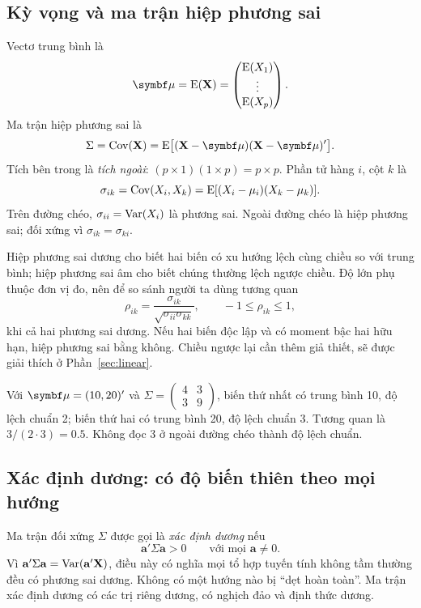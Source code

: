\subsection{Kỳ vọng và ma trận hiệp phương sai}
Vectơ trung bình là
\[
 \vmu=\E(\mathbf X)=\begin{pmatrix}\E(X_1)\\\vdots\\\E(X_p)\end{pmatrix}.
\]
Ma trận hiệp phương sai là
\begin{equation}
 \Sigma=\Cov(\mathbf X)
 =\E\bigl[(\mathbf X-\vmu)(\mathbf X-\vmu)'\bigr].
 \label{eq:covdef}
\end{equation}
Tích bên trong là \emph{tích ngoài}: $(p\times1)(1\times p)=p\times p$.
Phần tử hàng $i$, cột $k$ là
\[
 \sigma_{ik}=\operatorname{Cov}(X_i,X_k)
 =\operatorname{E}[(X_i-\mu_i)(X_k-\mu_k)].
\]
Trên đường chéo, $\sigma_{ii}=\operatorname{Var}(X_i)$ là phương sai. Ngoài đường chéo là
hiệp phương sai; đối xứng vì $\sigma_{ik}=\sigma_{ki}$.

Hiệp phương sai dương cho biết hai biến có xu hướng lệch cùng chiều so với
trung bình; hiệp phương sai âm cho biết chúng thường lệch ngược chiều.
Độ lớn phụ thuộc đơn vị đo, nên để so sánh người ta dùng tương quan
\[
 \rho_{ik}=\frac{\sigma_{ik}}{\sqrt{\sigma_{ii}\sigma_{kk}}},
 \qquad -1\le\rho_{ik}\le1,
\]
khi cả hai phương sai dương. Nếu hai biến độc lập và có moment bậc hai hữu hạn,
hiệp phương sai bằng không. Chiều ngược lại cần thêm giả thiết, sẽ được giải thích
ở Phần~\ref{sec:linear}.

\begin{example}
Với $\vmu=(10,20)'$ và $\Sigma=\begin{pmatrix}4&3\\3&9\end{pmatrix}$,
biến thứ nhất có trung bình 10, độ lệch chuẩn 2; biến thứ hai có trung bình 20,
độ lệch chuẩn 3. Tương quan là $3/(2\cdot3)=0.5$.
Không đọc 3 ở ngoài đường chéo thành độ lệch chuẩn.
\end{example}

\subsection{Xác định dương: có độ biến thiên theo mọi hướng}
Ma trận đối xứng $\Sigma$ được gọi là \emph{xác định dương} nếu
\[
 \mathbf a'\Sigma\mathbf a>0\qquad\text{với mọi }\mathbf a\ne0.
\]
Vì $\mathbf a'\Sigma\mathbf a=\operatorname{Var}(\mathbf a'\mathbf X)$, điều này có nghĩa
mọi tổ hợp tuyến tính không tầm thường đều có phương sai dương. Không có một
hướng nào bị ``dẹt hoàn toàn''. Ma trận xác định dương có các trị riêng dương,
có nghịch đảo và định thức dương.

